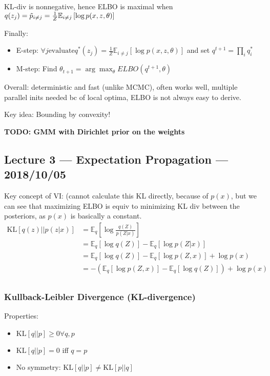 \documentclass{article}
\newcommand{\E}[2]{\mathbb{E}_{#1}\left[#2\right]}
\newcommand{\KL}[2]{\mathrm{KL}\left[#1||#2\right]}
\begin{document}
KL-div is nonnegative, hence ELBO is maximal when $q(z_j) = \Tilde{p}_{i \neq j} = \frac{1}{Z}\E{i \neq j}{\log p(x, z, \theta)}$

Finally:
\begin{itemize}
    \item E-step: $\forall j \mathrm{ evaluate } q^*(z_j) = \frac{1}{Z} \E{i \neq j}{\log p(x, z, \theta)}$ and set $q^{t+1} = \prod_i q_i^*$
    \item M-step: Find $\theta_{t+1} = \arg\max_\theta ELBO(q^{t+1}, \theta)$
\end{itemize}

Overall: deterministic and fast (unlike MCMC), often works well, multiple parallel inits needed bc of local optima, ELBO is not always easy to derive.

Key idea: Bounding by convexity!

\textbf{TODO: GMM with Dirichlet prior on the weights}

\subsection{Lecture 3 --- Expectation Propagation --- 2018/10/05}

Key concept of VI: (cannot calculate this KL directly, because of $p(x)$, but we can see that maximizing ELBO is equiv to minimizing KL div between the posteriors, as $p(x)$ is basically a constant.
\begin{align*}
\KL{q(z)}{p(z|x)} &= \E{q}{\log \frac{q(Z)}{p(Z|x)}}\\
&= \E{q}{\log q(Z)} - \E{q}{\log p(Z|x)}\\
&= \E{q}{\log q(Z)} - \E{q}{\log p(Z,x)} + \log p(x)\\
&= - (\E{q}{\log p(Z,x)} - \E{q}{\log q(Z)}) + \log p(x)\\
\end{align*}

\subsubsection{Kullback-Leibler Divergence (KL-divergence)}

Properties:
\begin{itemize}
    \item $\KL{q}{p} \geq 0 \forall q, p$
    \item $\KL{q}{p} = 0$ iff $q = p$
    \item No symmetry: $\KL{q}{p} \neq \KL{p}{q}$
\end{itemize}
\end{document}
